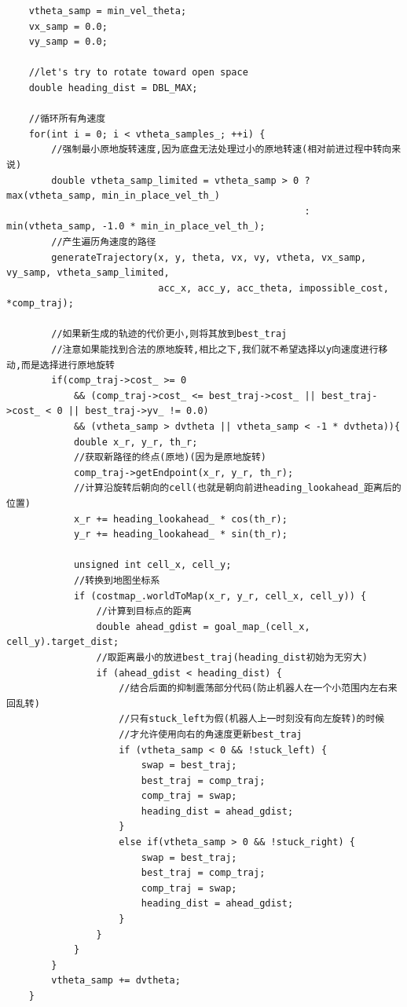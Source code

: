 \documentclass[9pt, oneside]{book}
\begin{document}
\footnotesize
\begin{verbatim}
    vtheta_samp = min_vel_theta;
    vx_samp = 0.0;
    vy_samp = 0.0;

    //let's try to rotate toward open space
    double heading_dist = DBL_MAX;

    //循环所有角速度
    for(int i = 0; i < vtheta_samples_; ++i) {
        //强制最小原地旋转速度,因为底盘无法处理过小的原地转速(相对前进过程中转向来说)
        double vtheta_samp_limited = vtheta_samp > 0 ? max(vtheta_samp, min_in_place_vel_th_)
                                                     : min(vtheta_samp, -1.0 * min_in_place_vel_th_);
        //产生遍历角速度的路径
        generateTrajectory(x, y, theta, vx, vy, vtheta, vx_samp, vy_samp, vtheta_samp_limited,
                           acc_x, acc_y, acc_theta, impossible_cost, *comp_traj);

        //如果新生成的轨迹的代价更小,则将其放到best_traj
        //注意如果能找到合法的原地旋转,相比之下,我们就不希望选择以y向速度进行移动,而是选择进行原地旋转
        if(comp_traj->cost_ >= 0
            && (comp_traj->cost_ <= best_traj->cost_ || best_traj->cost_ < 0 || best_traj->yv_ != 0.0)
            && (vtheta_samp > dvtheta || vtheta_samp < -1 * dvtheta)){
            double x_r, y_r, th_r;
            //获取新路径的终点(原地)(因为是原地旋转)
            comp_traj->getEndpoint(x_r, y_r, th_r);
            //计算沿旋转后朝向的cell(也就是朝向前进heading_lookahead_距离后的位置)
            x_r += heading_lookahead_ * cos(th_r);
            y_r += heading_lookahead_ * sin(th_r);

            unsigned int cell_x, cell_y;
            //转换到地图坐标系
            if (costmap_.worldToMap(x_r, y_r, cell_x, cell_y)) {
                //计算到目标点的距离
                double ahead_gdist = goal_map_(cell_x, cell_y).target_dist;
                //取距离最小的放进best_traj(heading_dist初始为无穷大)
                if (ahead_gdist < heading_dist) {
                    //结合后面的抑制震荡部分代码(防止机器人在一个小范围内左右来回乱转)
                    //只有stuck_left为假(机器人上一时刻没有向左旋转)的时候
                    //才允许使用向右的角速度更新best_traj
                    if (vtheta_samp < 0 && !stuck_left) {
                        swap = best_traj;
                        best_traj = comp_traj;
                        comp_traj = swap;
                        heading_dist = ahead_gdist;
                    }
                    else if(vtheta_samp > 0 && !stuck_right) {
                        swap = best_traj;
                        best_traj = comp_traj;
                        comp_traj = swap;
                        heading_dist = ahead_gdist;
                    }
                }
            }
        }
        vtheta_samp += dvtheta;
    }
\end{verbatim}
\normalsize
\end{document}
